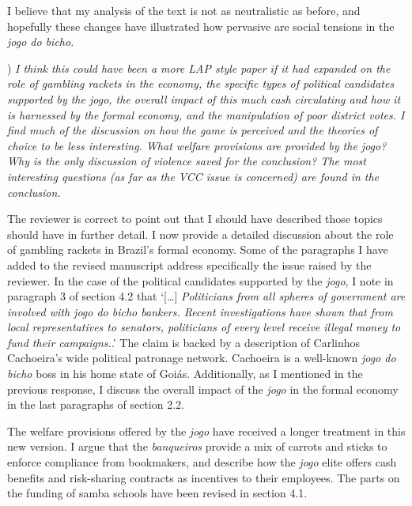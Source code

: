\documentclass[a4paper,12pt]{article}
\begin{document}
I believe that my analysis of the text is not as neutralistic as before, and hopefully these changes have illustrated how pervasive are social tensions in the \textit{jogo do bicho}.

\vspace{.5cm}

) \textit{I think this could have been a more LAP style paper if it had expanded on the role of gambling rackets in the economy, the specific types of political candidates supported by the jogo, the overall impact of this much cash circulating and how it is harnessed by the formal economy, and the manipulation of poor district votes. I find much of the discussion on how the game is perceived and the theories of choice to be less interesting. What welfare provisions are provided by the jogo? Why is the only discussion of violence saved for the conclusion? The most interesting questions (as far as the VCC issue is concerned) are found in the conclusion.}

\vspace{.25cm}

The reviewer is correct to point out that I should have described those topics should have in further detail. I now provide a detailed discussion about the role of gambling rackets in Brazil's formal economy. Some of the paragraphs I have added to the revised manuscript address specifically the issue raised by the reviewer. In the case of the political candidates supported by the \textit{jogo}, I note in paragraph 3 of section 4.2 that `[\dots] \textit{Politicians from all spheres of government are involved with jogo do bicho bankers. Recent investigations have shown that from local representatives to senators, politicians of every level receive illegal money to fund their campaigns.}.' The claim is backed by a description of Carlinhos Cachoeira's wide political patronage network. Cachoeira is a well-known \textit{jogo do bicho} boss in his home state of Goiás. Additionally, as I mentioned in the previous response, I discuss the overall impact of the \textit{jogo} in the formal economy in the last paragraphs of section 2.2.  

The welfare provisions offered by the \textit{jogo} have received a longer treatment in this new version. I argue that the \textit{banqueiros} provide a mix of carrots and sticks to enforce compliance from bookmakers, and describe how the \textit{jogo} elite offers cash benefits and risk-sharing contracts as incentives to their employees. The parts on the funding of samba schools have been revised in section 4.1.    
\end{document}
